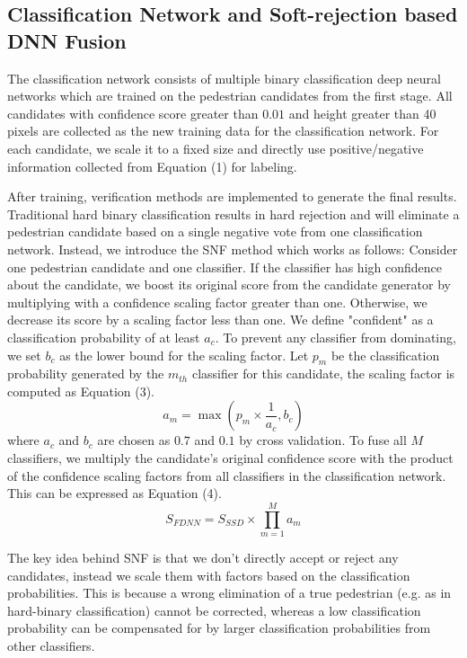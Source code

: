 \documentclass[10pt,letterpaper]{article}
\begin{document}
\subsection{Classification Network and Soft-rejection based DNN Fusion}
The classification network consists of multiple binary classification deep neural networks which are trained on the pedestrian candidates from the first stage. All candidates with confidence score greater than $0.01$ and height greater than 40 pixels are collected as the new training data for the classification network. For each candidate, we scale it to a fixed size and directly use positive/negative information collected from Equation (1) for labeling.

After training, verification methods are implemented to generate the final results. Traditional hard binary classification results in hard rejection and will eliminate a pedestrian candidate based on a single negative vote from one classification network. Instead, we introduce the SNF method which works as follows: Consider one pedestrian candidate and one classifier. If the classifier has high confidence about the candidate, we boost its original score from the candidate generator by multiplying with a confidence scaling factor greater than one. Otherwise, we decrease its score by a scaling factor less than one. We define "confident" as a classification probability of at least $a_c$. To prevent any classifier from dominating, we set $b_c$ as the lower bound for the scaling factor. Let $p_m$ be the classification probability generated by the $m_{th}$ classifier for this candidate, the scaling factor is computed as Equation (3).
\begin{equation}
a_{m}=\max(p_{m}\times \frac{1}{a_c},b_c)
\end{equation}
where $a_c$ and $b_c$ are chosen as $0.7$ and $0.1$ by cross validation. To fuse all $M$ classifiers, we multiply the candidate's original confidence score with the product of the confidence scaling factors from all classifiers in the classification network.
This can be expressed as Equation (4).
\begin{equation}
S_{FDNN}=S_{SSD}\times \prod_{m=1}^{M}a_m 
\end{equation}

The key idea behind SNF is that we don't directly accept or reject any candidates, instead we scale them with factors based on the classification probabilities. This is because a wrong elimination of a true pedestrian (e.g. as in hard-binary classification) cannot be corrected, whereas a low classification probability can be compensated for by larger classification probabilities from other classifiers.
\end{document}
